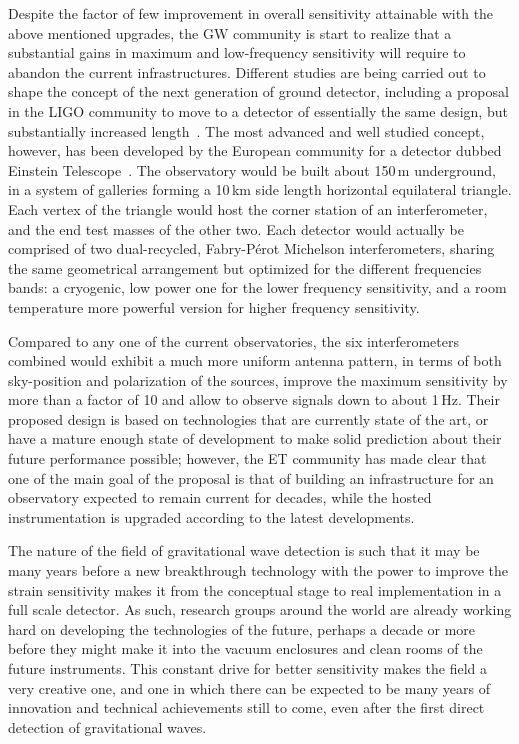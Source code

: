 Despite the factor of few improvement in overall sensitivity attainable with the above mentioned upgrades, the GW community is start to realize that a substantial gains in maximum and low-frequency sensitivity will require to abandon the current infrastructures. 
Different studies are being carried out to shape the concept of the next generation of ground detector, including a proposal in the LIGO community to move to a detector of essentially the same design, but substantially increased length~\cite{Dwyer2015}. The most advanced and well studied concept, however, has been developed by the European community for a detector dubbed Einstein Telescope~\cite{Punturo2010}.
The observatory would be built about 150\,m underground, in a system of galleries forming a 10\,km side length horizontal equilateral triangle. Each vertex of the triangle would host the corner station of an interferometer, and the end test masses of the other two. 
Each detector would actually be comprised of two dual-recycled, Fabry-P\'{e}rot Michelson  interferometers, sharing the same geometrical arrangement but optimized for the different frequencies bands: a cryogenic, low power one for the lower frequency sensitivity, and a room temperature more powerful version for higher frequency sensitivity.

Compared to any one of the current observatories, the six interferometers combined would exhibit a much more uniform antenna pattern, in terms of both sky-position and polarization of the sources, improve the maximum sensitivity by more than a factor of 10 and allow to observe signals down to about 1\,Hz. 
Their proposed design is based on technologies that are currently state of the art, or have a mature enough state of development to make solid prediction about their future performance possible; however, the ET community has made clear that one of the main goal of the proposal is that of building an infrastructure for an observatory expected to remain current for decades, while the hosted instrumentation is upgraded according to the latest developments.

The nature of the field of gravitational wave detection is such that it may be many years before a new breakthrough technology with the power to improve the strain sensitivity makes it from the conceptual stage to real implementation in a full scale detector. 
As such, research groups around the world are already working hard on developing the technologies of the future, perhaps a decade or more before they might make it into the vacuum enclosures and clean rooms of the future instruments. 
This constant drive for better sensitivity makes the field a very creative one, and one in which there can be expected to be many years of innovation and technical achievements still to come, even after the first direct detection of gravitational waves. 